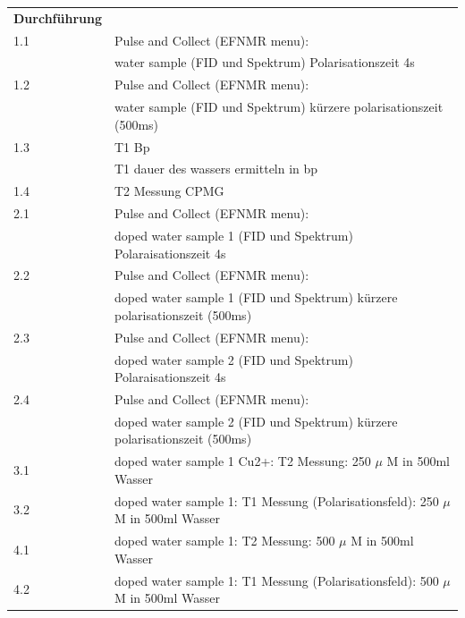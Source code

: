  \begin{tabular}{ll}   
    \textbf{Durchführung} & \\
           1.1 & Pulse and Collect (EFNMR menu): \\
           & water sample (FID und Spektrum) Polarisationszeit 4s \\
    
           1.2 & Pulse and Collect (EFNMR menu): \\
           & water sample (FID und Spektrum) kürzere polarisationszeit (500ms) \\

           1.3 & T1 Bp\\
           &  T1 dauer des wassers ermitteln in bp\\

           1.4 & T2 Messung CPMG\\
    
           2.1 & Pulse and Collect (EFNMR menu): \\
           & doped water sample 1 (FID und Spektrum) Polaraisationszeit 4s \\
    
           2.2 & Pulse and Collect (EFNMR menu): \\
           &doped water sample 1 (FID und Spektrum) kürzere polarisationszeit (500ms) \\

           2.3 & Pulse and Collect (EFNMR menu): \\
           & doped water sample 2 (FID und Spektrum) Polaraisationszeit 4s \\
    
           2.4 & Pulse and Collect (EFNMR menu): \\
           & doped water sample 2 (FID und Spektrum) kürzere polarisationszeit (500ms) \\ 

           3.1 & doped water sample 1 Cu2+: T2 Messung: 250 $\mu$ M in 500ml Wasser \\
    
           3.2 & doped water sample 1: T1 Messung (Polarisationsfeld): 250 $\mu$ M in 500ml Wasser \\
    
           4.1 & doped water sample 1: T2 Messung: 500 $\mu$ M in 500ml Wasser \\
    
           4.2 & doped water sample 1: T1 Messung (Polarisationsfeld): 500 $\mu$ M in 500ml Wasser \\


\end{tabular}
